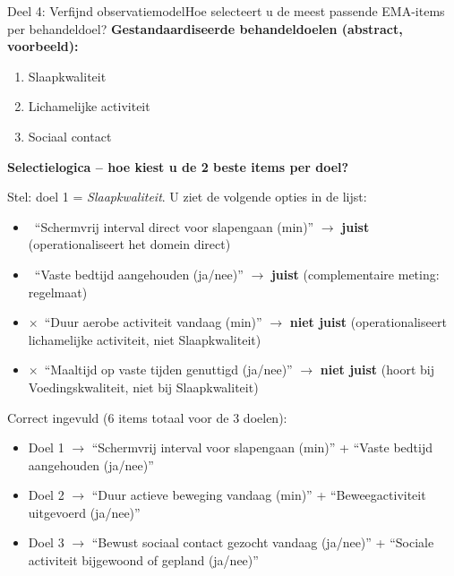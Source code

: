 \documentclass[11pt,a4paper]{article}
\begin{document}
\begin{voorbeeldbox}{Deel 4: Verfijnd observatiemodel}{Hoe selecteert u de meest passende EMA-items per behandeldoel?}
\small
\textbf{Gestandaardiseerde behandeldoelen (abstract, voorbeeld):}
\begin{enumerate}[topsep=2pt,itemsep=1pt,label=\arabic*.]
\item Slaapkwaliteit
\item Lichamelijke activiteit
\item Sociaal contact
\end{enumerate}

\textbf{Selectielogica -- hoe kiest u de 2 beste items per doel?}

Stel: doel 1 = \textit{Slaapkwaliteit}. U ziet de volgende opties in de lijst:
\begin{itemize}[topsep=2pt,itemsep=1pt]
\item \checkmark\ ``Schermvrij interval direct voor slapengaan (min)'' $\rightarrow$ \textbf{juist} (operationaliseert het domein direct)
\item \checkmark\ ``Vaste bedtijd aangehouden (ja/nee)'' $\rightarrow$ \textbf{juist} (complementaire meting: regelmaat)
\item $\times$\ ``Duur aerobe activiteit vandaag (min)'' $\rightarrow$ \textbf{niet juist} (operationaliseert lichamelijke activiteit, niet Slaapkwaliteit)
\item $\times$\ ``Maaltijd op vaste tijden genuttigd (ja/nee)'' $\rightarrow$ \textbf{niet juist} (hoort bij Voedingskwaliteit, niet bij Slaapkwaliteit)
\end{itemize}

\medskip
Correct ingevuld (6 items totaal voor de 3 doelen):
\begin{itemize}[topsep=1pt,itemsep=0pt]
\item Doel 1 $\rightarrow$ ``Schermvrij interval voor slapengaan (min)'' + ``Vaste bedtijd aangehouden (ja/nee)''
\item Doel 2 $\rightarrow$ ``Duur actieve beweging vandaag (min)'' + ``Beweegactiviteit uitgevoerd (ja/nee)''
\item Doel 3 $\rightarrow$ ``Bewust sociaal contact gezocht vandaag (ja/nee)'' + ``Sociale activiteit bijgewoond of gepland (ja/nee)''
\end{itemize}
\end{voorbeeldbox}

\vspace{0.5em}
\end{document}
